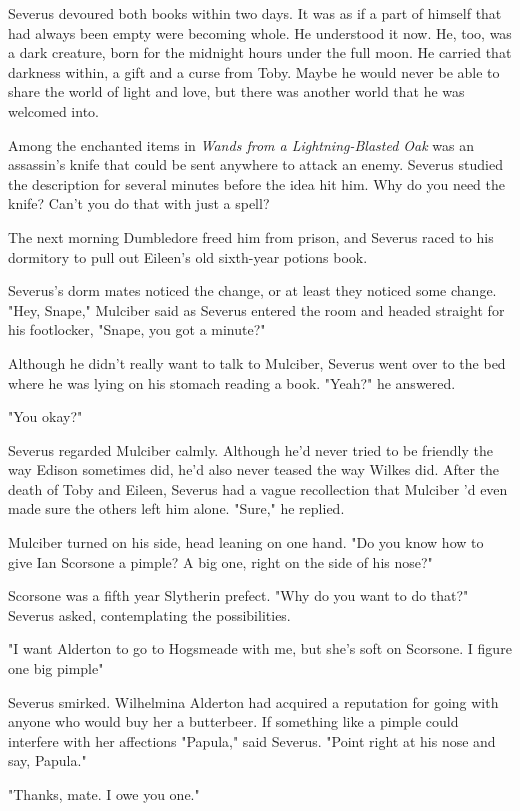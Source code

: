 Severus devoured both books within two days. It was as if a part of himself that had always been empty were becoming whole. He understood it now. He, too, was a dark creature, born for the midnight hours under the full moon. He carried that darkness within, a gift and a curse from Toby. Maybe he would never be able to share the world of light and love, but there was another world that he was welcomed into.

Among the enchanted items in \emph{Wands from a Lightning-Blasted Oak} was an assassin's knife that could be sent anywhere to attack an enemy. Severus studied the description for several minutes before the idea hit him. Why do you need the knife? Can't you do that with just a spell?

The next morning Dumbledore freed him from prison, and Severus raced to his dormitory to pull out Eileen's old sixth-year potions book.

Severus's dorm mates noticed the change, or at least they noticed some change. "Hey, Snape," Mulciber said as Severus entered the room and headed straight for his footlocker, "Snape, you got a minute?"

Although he didn't really want to talk to Mulciber, Severus went over to the bed where he was lying on his stomach reading a book. "Yeah?" he answered.

"You okay?"

Severus regarded Mulciber calmly. Although he'd never tried to be friendly the way Edison sometimes did, he'd also never teased the way Wilkes did. After the death of Toby and Eileen, Severus had a vague recollection that Mulciber 'd even made sure the others left him alone. "Sure," he replied.

Mulciber turned on his side, head leaning on one hand. "Do you know how to give Ian Scorsone a pimple? A big one, right on the side of his nose?"

Scorsone was a fifth year Slytherin prefect. "Why do you want to do that?" Severus asked, contemplating the possibilities.

"I want Alderton to go to Hogsmeade with me, but she's soft on Scorsone. I figure one big pimple{\el}"

Severus smirked. Wilhelmina Alderton had acquired a reputation for going with anyone who would buy her a butterbeer. If something like a pimple could interfere with her affections{\el} "Papula," said Severus. "Point right at his nose and say, Papula."

"Thanks, mate. I owe you one."


